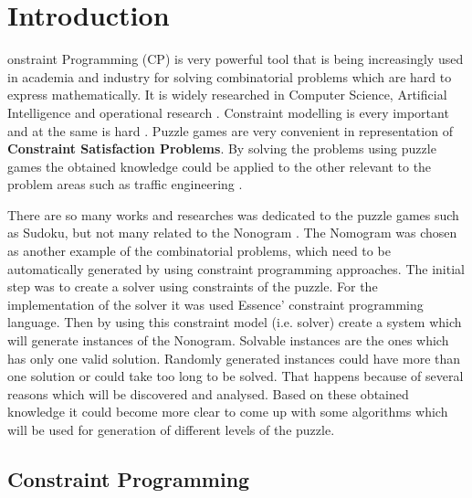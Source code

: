 \let\textcircled=\pgftextcircled
\chapter{Introduction}
\label{chap:intro}
onstraint Programming (CP) is very powerful tool that is being increasingly used in academia and industry for solving combinatorial problems which are hard to express mathematically. It is widely researched in Computer Science, Artificial Intelligence and operational research \cite{hanbook_cp}. Constraint modelling is every important and at the same is hard \cite{savile_row_paper}. Puzzle games are very convenient in representation of \textbf{Constraint Satisfaction Problems}. By solving the problems using puzzle games the obtained knowledge could be applied to the other relevant to the problem areas such as traffic engineering \cite{industry,nonogram_reinforcement}.


There are so many works and researches was dedicated to the puzzle games such as Sudoku, but not many related to the Nonogram \cite{Sudoku_as_CP}. The Nomogram was chosen as another example of the combinatorial problems, which need to be automatically generated by using constraint programming approaches. The initial step was to create a solver using constraints of the puzzle. For the implementation of the solver it was used Essence’ constraint programming language. Then by using this constraint model (i.e. solver) create a system which will generate instances of the Nonogram. Solvable instances are the ones which has only one valid solution. Randomly generated instances could have more than one solution or could take too long to be solved. That happens because of several reasons which will be discovered and analysed. Based on these obtained knowledge it could become more clear to come up with some algorithms which will be used for generation of different levels of the puzzle. 



\section{Constraint Programming}
\label{sec:subsec_cp}


